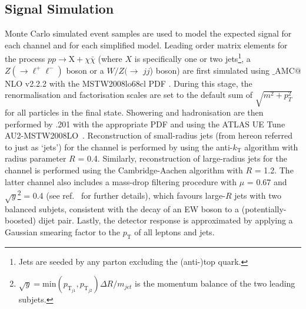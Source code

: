 \subsection{Signal Simulation}
\label{signal_generation}
Monte Carlo simulated event samples are used to model the expected signal for each channel and for each simplified model. Leading order matrix elements for the process $pp \rightarrow \mathrm{X} + \chi\bar{\chi}$ (where $X$ is specifically one or two jets\footnote{Jets are seeded by any parton excluding the (anti-)top quark.}, a $Z(\rightarrow \ell^+ \ell^-)$ boson or a $W/Z(\rightarrow$ $jj$) boson) are first simulated using \MG$\_${\footnotesize A}MC$@$NLO v2.2.2 \cite{MG_aMCNLO2014} with the MSTW2008lo68cl PDF \cite{MSTW}. During this stage, the renormalisation and factorisation scales are set to the default sum of $\sqrt{m^{2} + p_{T}^{2}}$ for all particles in the final state. Showering and hadronisation are then performed by \PYTHIA.201 \cite{pythia8} with the appropriate PDF and using the ATLAS UE Tune AU2-MSTW2008LO~\cite{AUtune}. Reconstruction of small-radius jets (from hereon referred to just as `jets') for the \monojet channel is performed by \FASTJET \cite{FastJet} using the anti-$k_{\mathrm{T}}$ algorithm with radius parameter $R$ = 0.4. Similarly, reconstruction of large-radius jets for the \monoWZ channel is performed using the Cambridge-Aachen algorithm with $R$ = 1.2. The latter channel also includes a mass-drop filtering procedure with $\mu$ = 0.67 and $\sqrt{y}$\footnote{$\sqrt{y} = \mathrm{min}(p_{\mathrm{T}_{j1}},p_{\mathrm{T}_{j2}})\Delta R / m_{jet}$ is the momentum balance of the two leading subjets.} = 0.4 (see ref.~\cite{massdrop} for further details), which favours large-$R$ jets with two balanced subjets, consistent with the decay of an EW boson to a (potentially-boosted) dijet pair. Lastly, the detector response is approximated by applying a Gaussian smearing factor to the $p_{\mathrm{T}}$ of all leptons and jets.

